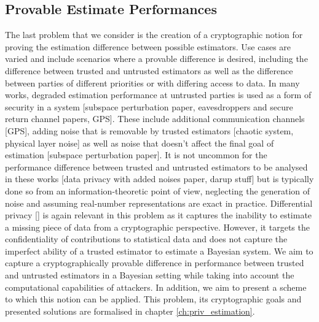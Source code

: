 % 
% 

\subsection{Provable Estimate Performances}\label{subsec:intro:provable_est_perf}
The last problem that we consider is the creation of a cryptographic notion for proving the estimation difference between possible estimators. Use cases are varied and include scenarios where a provable difference is desired, including the difference between trusted and untrusted estimators as well as the difference between parties of different priorities or with differing access to data. In many works, degraded estimation performance at untrusted parties is used as a form of security in a system [subspace perturbation paper, eavesdroppers and secure return channel papers, GPS]. These include additional communication channels [GPS], adding noise that is removable by trusted estimators [chaotic system, physical layer noise] as well as noise that doesn't affect the final goal of estimation [subspace perturbation paper]. It is not uncommon for the performance difference between trusted and untrusted estimators to be analysed in these works [data privacy with added noises paper, darup stuff] but is typically done so from an information-theoretic point of view, neglecting the generation of noise and assuming real-number representations are exact in practice. Differential privacy [] is again relevant in this problem as it captures the inability to estimate a missing piece of data from a cryptographic perspective. However, it targets the confidentiality of contributions to statistical data and does not capture the imperfect ability of a trusted estimator to estimate a Bayesian system. We aim to capture a cryptographically provable difference in performance between trusted and untrusted estimators in a Bayesian setting while taking into account the computational capabilities of attackers. In addition, we aim to present a scheme to which this notion can be applied. This problem, its cryptographic goals and presented solutions are formalised in chapter \ref{ch:priv_estimation}.

% 
%                                                
%                                                
%                                                
% 


